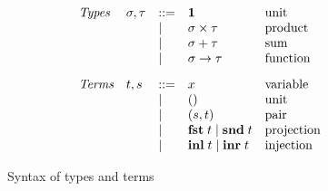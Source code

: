 \begin{figure}
  \small
  \[
  \begin{array}{lllll}
    \textit{Types} &
    \sigma, \tau
    & ::= &
    \mathbf{1}
    &
    \text{unit}
    \\
    && \mid &
    \sigma \times \tau
    &
    \text{product}
    \\
    && \mid &
    \sigma + \tau
    &
    \text{sum}
    \\
    && \mid &
    \sigma \to \tau
    &
    \text{function}
    \\[3mm]
    \textit{Terms} &
    t, s
    & ::= &
    x
    &
    \text{variable}
    \\
    && \mid &
    ()
    &
    \text{unit}
    \\
    && \mid &
    (s,t)
    &
    \text{pair}
    \\
    && \mid &
    \mathbf{fst}\;t \mid \mathbf{snd}\;t
    &
    \text{projection}
    \\
    && \mid &
    \mathbf{inl}\;t \mid \mathbf{inr}\;t
    &
    \text{injection}
    \\
  \end{array}
  \]
  \caption{Syntax of types and terms }
\end{figure}
